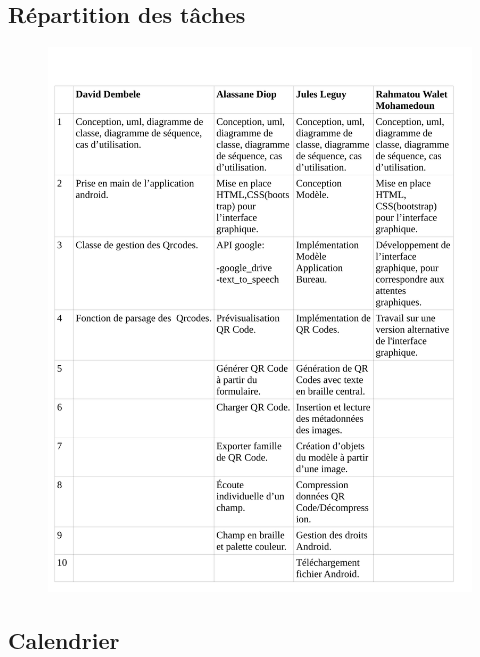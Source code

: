 \subsection{Répartition des tâches}


\begin{figure}[!h]
	\centering
   \includegraphics[scale=0.28]{img/taches.png}
\end{figure}

\newpage
\subsection{Calendrier}

\vspace{1cm}


